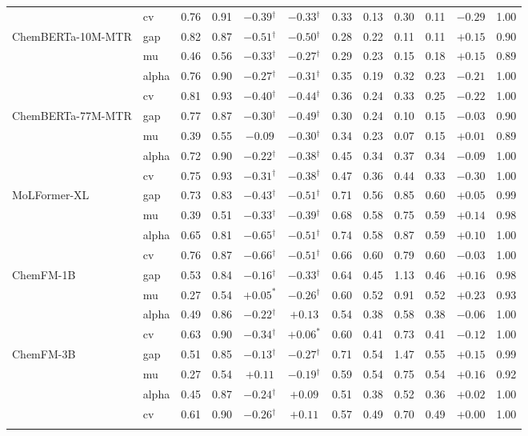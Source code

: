 \begin{tabular}{llcccccccccc}
 & cv & 0.76 & 0.91 & $-0.39$$^\dagger$ & $-0.33$$^\dagger$ & 0.33 & 0.13 & 0.30 & 0.11 & $-0.29$ & 1.00 \\
\addlinespace[2pt]
ChemBERTa-10M-MTR & gap & 0.82 & 0.87 & $-0.51$$^\dagger$ & $-0.50$$^\dagger$ & 0.28 & 0.22 & 0.11 & 0.11 & $+0.15$ & 0.90 \\
 & mu & 0.46 & 0.56 & $-0.33$$^\dagger$ & $-0.27$$^\dagger$ & 0.29 & 0.23 & 0.15 & 0.18 & $+0.15$ & 0.89 \\
 & alpha & 0.76 & 0.90 & $-0.27$$^\dagger$ & $-0.31$$^\dagger$ & 0.35 & 0.19 & 0.32 & 0.23 & $-0.21$ & 1.00 \\
 & cv & 0.81 & 0.93 & $-0.40$$^\dagger$ & $-0.44$$^\dagger$ & 0.36 & 0.24 & 0.33 & 0.25 & $-0.22$ & 1.00 \\
\addlinespace[2pt]
ChemBERTa-77M-MTR & gap & 0.77 & 0.87 & $-0.30$$^\dagger$ & $-0.49$$^\dagger$ & 0.30 & 0.24 & 0.10 & 0.15 & $-0.03$ & 0.90 \\
 & mu & 0.39 & 0.55 & $-0.09$ & $-0.30$$^\dagger$ & 0.34 & 0.23 & 0.07 & 0.15 & $+0.01$ & 0.89 \\
 & alpha & 0.72 & 0.90 & $-0.22$$^\dagger$ & $-0.38$$^\dagger$ & 0.45 & 0.34 & 0.37 & 0.34 & $-0.09$ & 1.00 \\
 & cv & 0.75 & 0.93 & $-0.31$$^\dagger$ & $-0.38$$^\dagger$ & 0.47 & 0.36 & 0.44 & 0.33 & $-0.30$ & 1.00 \\
\addlinespace[2pt]
MoLFormer-XL & gap & 0.73 & 0.83 & $-0.43$$^\dagger$ & $-0.51$$^\dagger$ & 0.71 & 0.56 & 0.85 & 0.60 & $+0.05$ & 0.99 \\
 & mu & 0.39 & 0.51 & $-0.33$$^\dagger$ & $-0.39$$^\dagger$ & 0.68 & 0.58 & 0.75 & 0.59 & $+0.14$ & 0.98 \\
 & alpha & 0.65 & 0.81 & $-0.65$$^\dagger$ & $-0.51$$^\dagger$ & 0.74 & 0.58 & 0.87 & 0.59 & $+0.10$ & 1.00 \\
 & cv & 0.76 & 0.87 & $-0.66$$^\dagger$ & $-0.51$$^\dagger$ & 0.66 & 0.60 & 0.79 & 0.60 & $-0.03$ & 1.00 \\
\addlinespace[2pt]
ChemFM-1B & gap & 0.53 & 0.84 & $-0.16$$^\dagger$ & $-0.33$$^\dagger$ & 0.64 & 0.45 & 1.13 & 0.46 & $+0.16$ & 0.98 \\
 & mu & 0.27 & 0.54 & $+0.05^{*}$ & $-0.26$$^\dagger$ & 0.60 & 0.52 & 0.91 & 0.52 & $+0.23$ & 0.93 \\
 & alpha & 0.49 & 0.86 & $-0.22$$^\dagger$ & $+0.13$ & 0.54 & 0.38 & 0.58 & 0.38 & $-0.06$ & 1.00 \\
 & cv & 0.63 & 0.90 & $-0.34$$^\dagger$ & $+0.06^{*}$ & 0.60 & 0.41 & 0.73 & 0.41 & $-0.12$ & 1.00 \\
\addlinespace[2pt]
ChemFM-3B & gap & 0.51 & 0.85 & $-0.13$$^\dagger$ & $-0.27$$^\dagger$ & 0.71 & 0.54 & 1.47 & 0.55 & $+0.15$ & 0.99 \\
 & mu & 0.27 & 0.54 & $+0.11$ & $-0.19$$^\dagger$ & 0.59 & 0.54 & 0.75 & 0.54 & $+0.16$ & 0.92 \\
 & alpha & 0.45 & 0.87 & $-0.24$$^\dagger$ & $+0.09$ & 0.51 & 0.38 & 0.52 & 0.36 & $+0.02$ & 1.00 \\
 & cv & 0.61 & 0.90 & $-0.26$$^\dagger$ & $+0.11$ & 0.57 & 0.49 & 0.70 & 0.49 & $+0.00$ & 1.00 \\
\addlinespace[2pt]
\bottomrule
\end{tabular}
